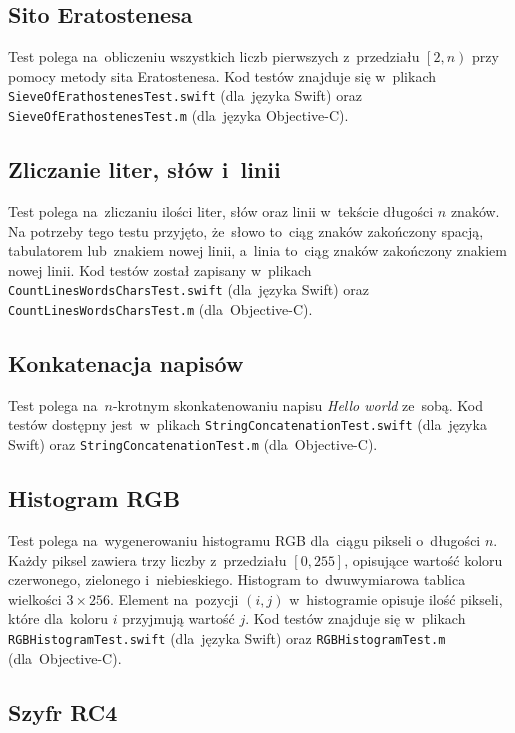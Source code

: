 \documentclass[mgr, shortabstract]{iithesis}
\begin{document}
\subsection{Sito Eratostenesa}

Test polega na~obliczeniu wszystkich liczb pierwszych z~przedziału $\left[2, n\right)$ przy pomocy metody sita Eratostenesa. Kod testów znajduje się w~plikach \texttt{SieveOfErathostenesTest.swift} (dla~języka Swift) oraz \texttt{SieveOfErathostenesTest.m} (dla~języka Objective-C).

\subsection{Zliczanie liter, słów i~linii}

Test polega na~zliczaniu ilości liter, słów oraz linii w~tekście długości $n$ znaków. Na potrzeby tego testu przyjęto, że~słowo to~ciąg znaków zakończony spacją, tabulatorem lub~znakiem nowej linii, a~linia to~ciąg znaków zakończony znakiem nowej linii. Kod testów został zapisany w~plikach \texttt{CountLinesWordsCharsTest.swift} (dla~języka Swift) oraz \texttt{CountLinesWordsCharsTest.m} (dla~Objective-C).

\subsection{Konkatenacja napisów}

Test polega na~$n$-krotnym skonkatenowaniu napisu \textit{Hello world} ze~sobą. Kod testów dostępny jest~w~plikach \texttt{StringConcatenationTest.swift} (dla~języka Swift) oraz \texttt{StringConcatenationTest.m} (dla~Objective-C).

\subsection{Histogram RGB}

Test polega na~wygenerowaniu histogramu RGB dla~ciągu pikseli o~długości $n$. Każdy piksel zawiera trzy liczby z~przedziału $\left[0, 255\right]$, opisujące wartość koloru czerwonego, zielonego i~niebieskiego. Histogram to~dwuwymiarowa tablica wielkości $3 \times 256$. Element na~pozycji $(i, j)$ w~histogramie opisuje ilość pikseli, które dla~koloru $i$ przyjmują wartość $j$. Kod testów znajduje się w~plikach \texttt{RGBHistogramTest.swift} (dla~języka Swift) oraz \texttt{RGBHistogramTest.m} (dla~Objective-C).

\subsection{Szyfr RC4}
\end{document}
